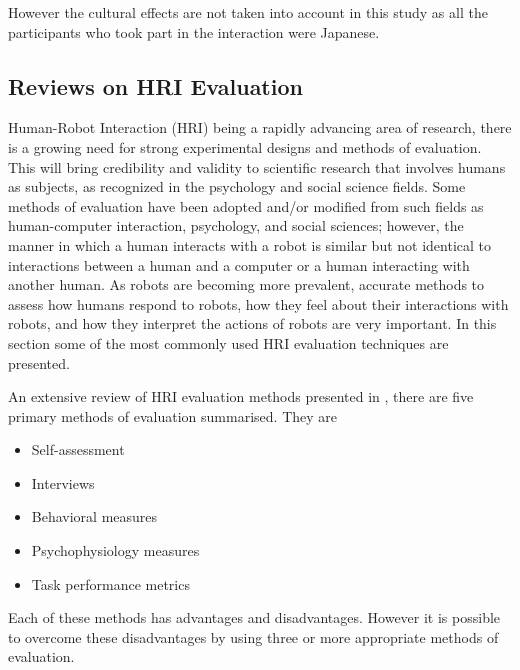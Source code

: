 However the cultural effects are not taken into account in this study as all the participants who took part in the interaction were Japanese. 

\subsection{Reviews on HRI Evaluation}

Human-Robot Interaction (HRI) being a rapidly advancing area of research, there is a growing need for strong experimental designs and methods of evaluation. This will bring credibility and validity to scientific research that involves humans as subjects, as recognized in the psychology and social science fields. Some methods of evaluation have been adopted and/or modified from such fields as human-computer interaction, psychology, and social sciences; however, the manner in which a human interacts with a robot is similar but not identical to interactions between a human and a computer or a human interacting with another human. As robots are becoming more prevalent, accurate methods to assess how humans respond to robots, how they feel about their interactions with robots, and how they interpret the actions of robots are very important. In this section some of the most commonly used HRI evaluation techniques are presented. 

An extensive review of HRI evaluation methods presented in \cite{Bethel2010}, there are five primary methods of evaluation summarised. They are

\begin{itemize}
\item Self-assessment
\item Interviews
\item Behavioral measures
\item Psychophysiology measures
\item Task performance metrics
\end{itemize}

Each of these methods has advantages and disadvantages. However it is possible to overcome these disadvantages by using three or more appropriate methods of evaluation. 

